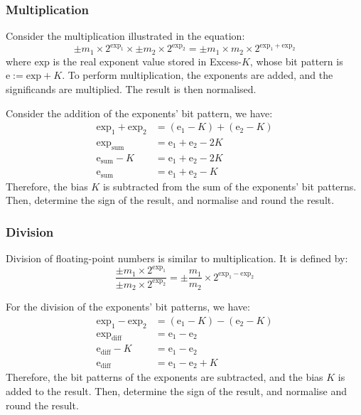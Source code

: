 \subsubsection{Multiplication}

Consider the multiplication illustrated in the equation:
\begin{equation*}
    \pm m_1\times 2^{\text{exp}_1} \times \pm m_2\times 2^{\text{exp}_2} =
    \pm m_1\times m_2\times 2^{\text{exp}_1 + \text{exp}_2}
\end{equation*}
where $\text{exp}$ is the real exponent value stored in Excess-$K$, whose bit pattern is
$\text{e} := \text{exp} + K$. To perform multiplication, the exponents are added, and the
significands are multiplied. The result is then normalised.

Consider the addition of the exponents' bit pattern, we have:
\begin{align*}
    \text{exp}_1 + \text{exp}_2 &= (\text{e}_1 - K) + (\text{e}_2 - K) \\
    \text{exp}_\text{sum} &= \text{e}_1 + \text{e}_2 - 2K \\
    \text{e}_\text{sum} - K &= \text{e}_1 + \text{e}_2 - 2K \\
    \text{e}_\text{sum} &= \text{e}_1 + \text{e}_2 - K
\end{align*}
Therefore, the bias $K$ is subtracted from the sum of the exponents' bit patterns.
Then, determine the sign of the result, and normalise and round the result.

\subsubsection{Division}

Division of floating-point numbers is similar to multiplication. It is defined by:
\begin{equation*}
    \frac{\pm m_1\times 2^{\text{exp}_1}}{\pm m_2\times 2^{\text{exp}_2}} =
    \pm \frac{m_1}{m_2}\times 2^{\text{exp}_1 - \text{exp}_2}
\end{equation*}

For the division of the exponents' bit patterns, we have:
\begin{align*}
    \text{exp}_1 - \text{exp}_2 &= (\text{e}_1 - K) - (\text{e}_2 - K) \\
    \text{exp}_\text{diff} &= \text{e}_1 - \text{e}_2 \\
    \text{e}_\text{diff} - K &= \text{e}_1 - \text{e}_2 \\
    \text{e}_\text{diff} &= \text{e}_1 - \text{e}_2 + K
\end{align*}
Therefore, the bit patterns of the exponents are subtracted, and the bias $K$ is added to the result.
Then, determine the sign of the result, and normalise and round the result.

